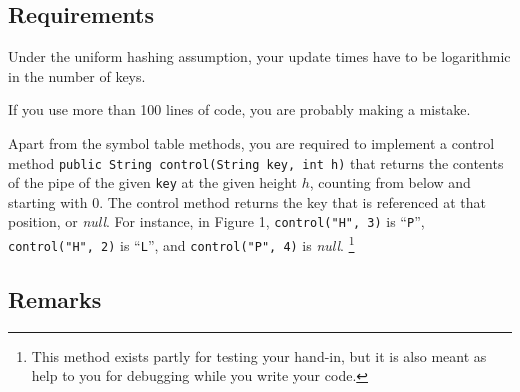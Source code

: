 \documentclass{tufte-handout}
\begin{document}
\subsection{Requirements}

Under the uniform hashing assumption, your update times have to be logarithmic in the number of keys.

If you use more than 100 lines of code, you are probably making a mistake.

Apart from the symbol table methods, you are required to implement a control method {\tt public String control(String key, int h)} that returns the contents of the pipe of the given {\tt key} at the given height $h$, counting from below and starting with $0$.
The control method returns the key that is referenced at that position, or \emph{null}.
For instance, in Figure 1, {\tt control("H", 3)} is ``{\tt P}'', {\tt control("H", 2)} is ``{\tt L}'', and {\tt control("P", 4)} is \emph{null}.
\footnote{This method exists partly for testing your hand-in, but it is also meant as help to you for debugging while you write your code.}

\subsection{Remarks}
\end{document}
